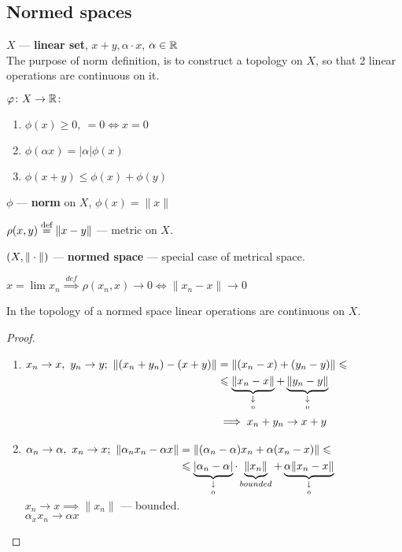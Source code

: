 \subsection{Normed spaces}
\begin{defn}
  $X$ --- \textbf{linear set}, $x + y, \alpha \cdot x$, $\alpha \in \mathbb{R}$ \\
  The purpose of norm definition, is to construct a topology on $X$, so that 2 linear operations are continuous on it.
\end{defn}
$\varphi\colon X \to \mathbb{R}\colon$
\begin{enumerate}
\item $\phi(x) \geq 0,\ = 0 \iff x = 0$
\item $\phi(\alpha x) = |\alpha| \phi(x)$
\item $\phi(x + y) \leq \phi(x) + \phi(y)$
\end{enumerate}
\begin{defn}
  $\phi$ --- \textbf{norm} on $X$, $\phi(x) = \|x\|$
\end{defn}
$\rho(x, y) \overset{\text{def}}{=} \|x - y\|$ --- metric on $X$.
\begin{defn}
  $\\(X, \|\cdot\|)$ --- \textbf{normed space} --- special case of metrical space.
\end{defn}
\noindent
$x = \lim x_n \overset{def}{\implies} \rho(x_n, x) \to 0 \iff \|x_n - x\| \to 0$
\begin{stm}
  In the topology of a normed space linear operations are continuous on $X$.
\end{stm}
\begin{proof}\leavevmode
  \begin{enumerate}
  \item
    $\begin{aligned}[t]
      x_n \to x,\ y_n \to y;\ \|(x_n + y_n) - (x + y)\| & = \|(x_n - x) + (y_n - y)\|  \leqslant \\
      & \leqslant  \underbrace{\|x_n - x\|}_{\underset{0}{\downarrow}} + \underbrace{\|y_n - y\|}_{\underset{0}{\downarrow}} \\
      & \implies x_n + y_n \to x + y
    \end{aligned}$
  \item
    $\begin{aligned}[t]
       \alpha_n \to \alpha,\ x_n \to x;\ \|\alpha_n x_n - \alpha x\| & =
        \|(\alpha_n - \alpha)x_n + \alpha(x_n - x)\| \leqslant \\
        & \leqslant \underbrace{|\alpha_n - \alpha|}_{\underset{0}{\downarrow}} \cdot \underbrace{\|x_n\|}_{bounded} + \underbrace{\alpha\|x_n - x\|}_{\underset{0}{\downarrow}}
    \end{aligned}$ \\
    $x_n \to x \implies \|x_n\|$ --- bounded. \\
    $\alpha_x x_n \to \alpha x$ \qedhere
  \end{enumerate}
\end{proof}
